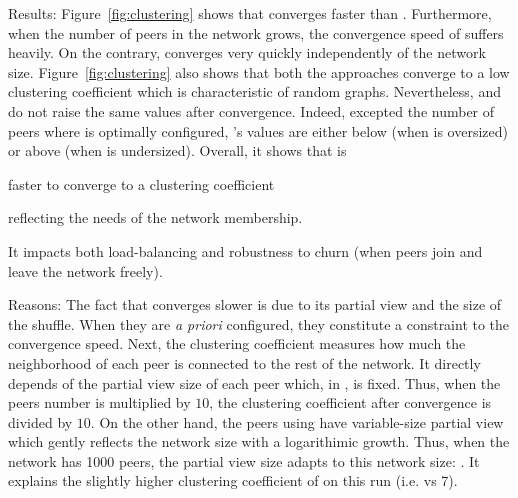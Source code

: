 \begin{asparadesc}
\item[Results:] Figure~\ref{fig:clustering} shows that \SPRAY{} converges
  faster than \CYCLON{}. Furthermore, when the number of peers in the network
  grows, the convergence speed of \CYCLON{} suffers heavily. On the contrary,
  \SPRAY{} converges very quickly independently of the network
  size. Figure~\ref{fig:clustering} also shows that both the approaches
  converge to a low clustering coefficient which is characteristic of random
  graphs. Nevertheless, \CYCLON{} and \SPRAY{} do not raise the same values
  after convergence. Indeed, excepted the number of peers where \CYCLON{} is
  optimally configured, \SPRAY{}'s values are either below (when \CYCLON{} is
  oversized) or above (when \CYCLON{} is undersized).  Overall, it shows that
  \SPRAY{} is
  \begin{inparaenum}
  \item faster to converge to a clustering coefficient
  \item reflecting the needs of the network membership.
  \end{inparaenum}
  It impacts both load-balancing and robustness to churn (when peers join and
  leave the network freely).
\item[Reasons:] The fact that \CYCLON{} converges slower is due to its partial
  view and the size of the shuffle. When they are \emph{a priori} configured,
  they constitute a constraint to the convergence speed.  Next, the clustering
  coefficient measures how much the neighborhood of each peer is connected to
  the rest of the network. It directly depends of the partial view size of each
  peer which, in \CYCLON{}, is fixed. Thus, when the peers number is multiplied
  by $10$, the clustering coefficient after convergence is divided by $10$. On
  the other hand, the peers using \SPRAY{} have variable-size partial view
  which gently reflects the network size with a logarithimic growth. Thus, when
  the network has 1000 peers, the partial view size adapts to this network
  size: . It explains the slightly higher clustering coefficient of
  \SPRAY{} on this run (i.e.  vs 7).
\end{asparadesc}

